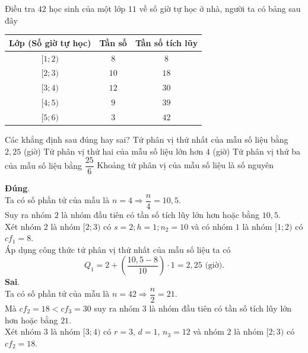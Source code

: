 \begin{ex}%
Điều tra $42$ học sinh của một lớp $11$ về số giờ tự học ở nhà, người ta có bảng sau đây
\begin{center}
\begin{tabular}{|c|c|c|}
\hline
Lớp (Số giờ tự học) & Tần số & Tần số tích lũy \\
\hline
$[1;2)$& $8$ & $8$ \\
\hline
$[2;3)$& $10$ & $18$ \\
\hline
$[3;4)$& $12$ & $30$ \\
\hline
$[4;5)$& $9$ & $39$ \\
\hline
$[5;6)$& $3$ & $42$ \\
\hline
\end{tabular}
\end{center}
Các khẳng định sau đúng hay sai?
\choiceTF
{\True Tứ phân vị thứ nhất của mẫu số liệu bằng $2{,}25$ (giờ)}
{Tứ phân vị thứ hai của mẫu số liệu lớn hơn $4$ (giờ)}
{\True Tứ phân vị thứ ba của mẫu số liệu bằng $\dfrac{25}{6}$}
{ Khoảng tứ phân vị của mẫu số liệu là số nguyên}
\loigiai
{
\begin{itemchoice}
\itemch \textbf{Đúng}.\\
Ta có số phần tử của mẫu là $n=4\Rightarrow \dfrac{n}{4}=10{,}5$.\\
Suy ra nhóm $2$ là nhóm đầu tiên có tần số tích lũy lớn hơn hoặc bằng $10{,}5$.\\
Xét nhóm $2$ là nhóm $[2;3)$ có $s=2; h=1; n_2=10$ và có nhóm $1$ là nhóm $[1;2)$ có $cf_1=8$.\\
Áp dụng công thức tứ phân vị thứ nhất của mẫu số liệu ta có \[Q_1=2+\left(\dfrac{10{,}5-8}{10}\right)\cdot 1=2{,}25\,\,\text{(giờ)}.\]
\itemch \textbf{Sai}.\\
Ta có số phần tử của mẫu là $n=42\Rightarrow \dfrac{n}{2}=21$.\\
Mà $cf_2=18<cf_3=30$ suy ra nhóm $3$ là nhóm đầu tiên có tần số tích lũy lớn hơn hoặc bằng $21$.\\
Xét nhóm $3$ là nhóm $[3;4)$ có $r=3$, $d=1$, $n_3=12$ và nhóm $2$ là nhóm $[2;3)$ có $cf_2=18$.\\

\end{itemchoice}}
\end{ex}

